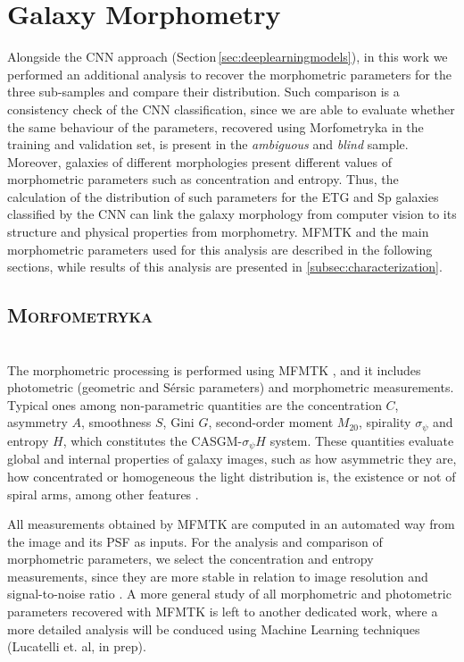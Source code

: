 \documentclass[fleqn,usenatbib]{mnras}
\begin{document}
\section{Galaxy Morphometry}
\label{sec:morphometry}
Alongside the CNN approach (Section\,\ref{sec:deeplearningmodels}), in this work we performed an additional analysis to recover the morphometric parameters for the three sub-samples and compare their distribution. Such comparison is a consistency check of the CNN classification, since we are able to evaluate whether the same behaviour of the parameters, recovered using Morfometryka \citep[hereafter \textsc{MFMTK}, see][]{Ferrari_2015} in the training and validation set, is present in the {\it ambiguous} and {\it blind} sample. Moreover, galaxies of different morphologies present different values of morphometric parameters \cite[][]{conselice2014} such as concentration and entropy. Thus, the calculation of the distribution of such parameters for the ETG and Sp galaxies classified by the CNN can link the galaxy morphology from computer vision to its structure and physical properties from morphometry. \textsc{MFMTK} and the main morphometric parameters used for this analysis are described in the following sections, while results of this analysis are presented in  \ref{subsec:characterization}.


\subsection{\textsc{Morfometryka}}\label{mfmtk} \ \\  
The morphometric processing is performed using \textsc{MFMTK} \citep[][]{Ferrari_2015}, and it includes photometric (geometric and Sérsic parameters) and morphometric measurements. 
Typical ones among non-parametric quantities are the concentration $C$, asymmetry $A$, smoothness $S$, Gini $G$, second-order moment $M_{20}$, spirality $\sigma_\psi$ and entropy $H$, which constitutes the CASGM-$\sigma_\psi H$ system. These quantities evaluate global and internal properties of galaxy images, such as how asymmetric they are, how concentrated or homogeneous the light distribution is, the existence or not of spiral arms, among other features \citep[for a review see][]{conselice2014}.

All measurements obtained by \textsc{MFMTK} are computed in an automated way from the image and its PSF as inputs. For the analysis and comparison of morphometric parameters, we select the concentration and entropy measurements, since they are more stable in relation to image resolution and signal-to-noise ratio \citep{Ferrari_2015,deAlbernaz2018}. 
A more general study of all  morphometric and photometric parameters recovered with \textsc{MFMTK} is left to another dedicated work, where a more detailed analysis will be conduced using Machine Learning techniques (Lucatelli et. al, in prep).
\end{document}
